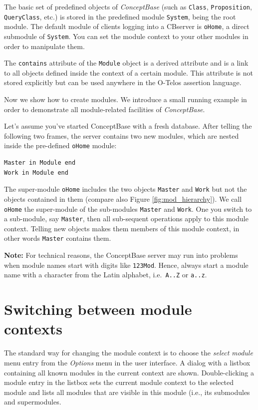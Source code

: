 The basic set of predefined objects of {\em ConceptBase} (such as {\tt Class}, {\tt Proposition}, {\tt QueryClass}, etc.) is stored in the predefined module {\tt System}, being the root module. 
The default module of clients logging into a CBserver is {\tt oHome}, a direct submodule of {\tt System}.
You can set the module context to your other modules in order to manipulate them.

The {\tt contains} attribute of the {\tt Module} object is a derived attribute and is a link
to all objects defined inside the context of a certain module. This attribute is not stored explicitly
but can be used anywhere in the O-Telos assertion language.

Now we show how to create modules.
We introduce a small running example in order to demonstrate all module-related facilities of
{\em ConceptBase}.

Let's assume you've started ConceptBase with a fresh database.
After telling the following two frames, the server contains two new modules, which are nested inside the pre-defined {\tt oHome} module:


\begin{verbatim}
Master in Module end
Work in Module end
\end{verbatim}

The super-module {\tt oHome} includes the two objects {\tt Master} and {\tt Work} but not the
objects contained in them (compare also Figure \ref{fig:mod_hierarchy}).
We call {\tt oHome} the super-module of the sub-modules
{\tt Master} and {\tt Work}. One you switch to a sub-module, say {\tt Master}, then all
sub-sequent operations apply to this module context. Telling new objects makes
them members of this module context, in other words {\tt Master} contains them.

{\bf Note:} For technical reasons, the ConceptBase server may run into problems 
when module names start with digits like {\tt 123Mod}. Hence, always start a module name
with a character from the Latin alphabet, i.e.\  {\tt A..Z} or {\tt a..z}.


\section{Switching between module contexts} \label{sec:switching_modules}


The standard way for changing the module context is to choose the {\em select module} menu entry
from the {\em Options} menu in the user interface. A dialog with a listbox containing
all known modules in the current context are shown.
Double-clicking a module entry in the listbox sets the current module context to the
selected module and lists all modules that are visible in this module (i.e., its
submodules and supermodules.

